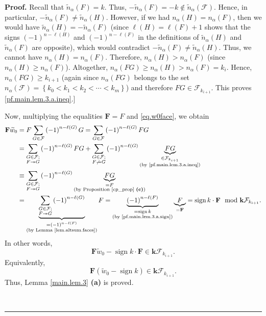 \documentclass[12pt]{article}
\theoremstyle{definition}%
\theoremstyle{definition}%
\theoremstyle{remark}%
\newcommand{\tup}[1]{\left( #1 \right)}
\newcommand{\set}[1]{\left\{ #1 \right\}}
\newcommand{\kk}{\mathbf{k}}
\newcommand{\kf}{\kk\mathcal{F}}
\newcommand{\FF}{\mathbf{F}}
\newcommand{\CF}{\mathcal{F}}
\newcommand{\wotil}{\widetilde{w}_0}
\newcommand{\na}{n_{ \alpha } }%
\newcommand{\nna}{\widetilde{n}_{ \alpha } }%
\newcommand{\sign}{\operatorname{sign}}
\newcommand{\con}{\twoheadrightarrow} %
\newenvironment{proof}[1][Proof]{\noindent\textbf{#1.} }{\ \rule{0.5em}{0.5em}}
\begin{document}
\begin{proof}
Recall that $\nna\tup{F} = k$.
Thus, $-\nna\tup{F} = -k \notin \nna\tup{\CF}$.
Hence, in particular, $-\nna\tup{F} \neq \nna\tup{H}$.
However, if we had $\na\tup{H} = \na\tup{F}$,
then we would have $\nna\tup{H} = -\nna\tup{F}$
(since $\ell\tup{H} = \ell\tup{F} + 1$ shows that
the signs $\tup{-1}^{n-\ell\tup{H}}$ and
$\tup{-1}^{n-\ell\tup{F}}$ in the definitions of
$\nna\tup{H}$ and $\nna\tup{F}$ are opposite),
which would contradict $-\nna\tup{F} \neq \nna\tup{H}$.
Thus, we cannot have $\na\tup{H} = \na\tup{F}$.
Therefore, $\na\tup{H} > \na\tup{F}$
(since $\na\tup{H} \geq \na\tup{F}$).
Altogether, 
$\na\tup{FG} \geq \na\tup{H} > \na\tup{F} = k_i$.
Hence, $\na\tup{FG} \geq k_{i+1}$
(again since $ \na\tup{ FG } $ belongs to the set
$ \na\tup{ \CF } = \set{k_0 < k_1 < k_2 < \cdots  < k_m} $)
and therefore $FG\in\CF_{k_{i+1}}$. This proves
\eqref{pf.main.lem.3.a.ineq}.] \medskip

Now, multiplying the equalities $\FF=F$ and \eqref{eq.w0face}, we
obtain
\begin{align*}
\FF\wotil &  =F\sum_{G\in\CF}\tup{ -1 }^{n-\ell
\tup{G} }G=\sum_{G\in\CF}\tup{ -1 }^{n-\ell\tup{G}
}FG\\
&  =\sum_{\substack{G\in\CF;\\F\con G}}
\tup{ -1 }^{n-\ell\tup{G} }FG+\sum_{\substack{G\in\CF;
\\F\not \con G}}\tup{ -1 }^{n-\ell\tup{G}
}\underbrace{FG}_{\substack{\in\CF_{k_{i+1}}\\\text{(by
\eqref{pf.main.lem.3.a.ineq})}}}\\
&  \equiv\sum_{\substack{G\in\CF;\\F\con G}}
\tup{ -1 }^{n-\ell\tup{G} }
\underbrace{FG}_{\substack{=F\\\text{(by
Proposition \ref{cp_prop} \textbf{(c)})}}}\\
&  =\underbrace{\sum_{\substack{G\in\CF;\\F\con
G}}\tup{ -1 }^{n-\ell\tup{G} }}_{\substack{=
\tup{-1}^{n-\ell\tup{F} }\\
\text{(by Lemma \ref{lem.altsum.faces})}}}
F
= \underbrace{\tup{-1}^{n-\ell \tup{F}}}_{\substack{
= \sign k \\ \text{(by \eqref{pf.main.lem.3.a.sign})}}}
 \underbrace{F}_{= \FF}
= \sign k \cdot \FF
\mod\kf_{k_{i+1}}.
\end{align*}
In other words,
\[
\FF \wotil - \sign k \cdot \FF \in \kf_{k_{i+1}}.
\]
Equivalently,
\[
\FF \tup{\wotil - \sign k}
\in \kf_{k_{i+1}}.
\]
Thus, Lemma \ref{main.lem.3} \textbf{(a)} is proved.
\medskip


\end{proof}
\end{document}
